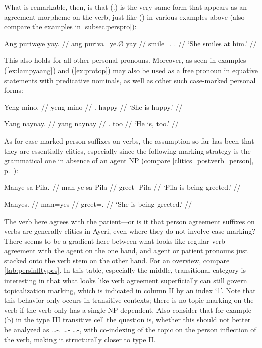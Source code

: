 \xe

What is remarkable, then, is that  (\TsgF{}.\Top{}) is the very 
same form that appears as an agreement morpheme on the verb, just like 
 (\TsgM{}) in various examples above (also compare the examples 
in \autoref{subsec:perspro}):

\ex %
\begingl
	\gla Ang purivaye yāy. //
	\glb ang puriva=ye.Ø yāy //
	\glc \AgtT{} smile=\TsgF{}.\Top{} \TsgM{}.\Loc{} //
	\glft `She smiles at him.' //
\endgl\xe

This also holds for all other personal pronouns. Moreover, 
 as seen in examples (\ref{ex:lampyaang}) and 
(\ref{ex:protop}) may also be used as a free pronoun in equative statements 
with predicative nominals, as well as other such case-marked personal forms:

\pex %
\a\begingl
	\gla Yeng mino. //
	\glb yeng mino //
	\glc \TsgF{}.\Aarg{} happy //
	\glft `She is happy.' //
\endgl
	
\a\begingl
	\gla Yāng naynay. //
	\glb yāng naynay //
	\glc \TsgM{}.\Aarg{} too //
	\glft `He is, too.' //
\endgl

\xe

\label{patagr} As for case-marked person suffixes on verbs, the
assumption so far has been  that they are essentially clitics, especially
since the following marking  strategy is the grammatical one in absence of an
agent NP (compare \autoref{clitics_postverb_person}, 
p.~\pageref{clitics_postverb_person}):

\pex\label{ex:passive} %
\a\label{ex:manye}\begingl
	\gla Manye sa Pila. //
	\glb man-ye sa ​Pila //
	\glc greet-\TsgF{} \Parg{} ​Pila //
	\glft `Pila is being greeted.' //
\endgl
	
\a\label{ex:manyes}\begingl
	\gla Manyes. //
	\glb man=yes //
	\glc greet=\TsgF{}.\Parg{} //
	\glft `She is being greeted.' //
\endgl

\xe

The verb here agrees with the patient---or is it that person agreement suffixes
on verbs are generally clitics in Ayeri, even where they do not involve case
marking? There seems to be a gradient here between what looks like regular verb
agreement with the agent on the one hand, and agent or patient pronouns just
stacked onto the verb stem on the other hand. For an overview, compare
\autoref{tab:persinfltypes}. In this table, especially the middle,
transitional category is interesting in that what looks like verb agreement
superficially can still govern topicalization marking, which is indicated in
column II by an index `1'. Note that this behavior only occurs in transitive
contexts; there is no topic marking on the verb if the verb only has a single
NP dependent. Also consider that for example (b) in the type III transitive
cell the question is, whether this should not better be analyzed as
\AgtT{} …-\TsgM{}.\Top{} …-\Top{} …-\Parg{}, with co-indexing of the topic on 
the person inflection of the verb, making it structurally closer to type II.

